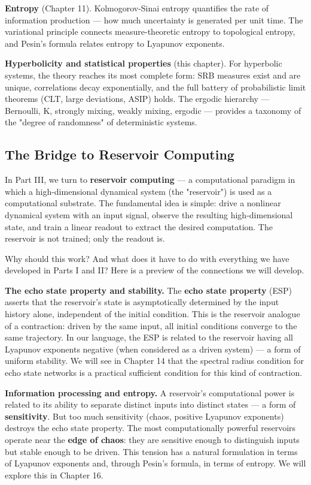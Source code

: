 \textbf{Entropy} (Chapter 11). Kolmogorov-Sinai entropy quantifies the rate of information production --- how much uncertainty is generated per unit time. The variational principle connects measure-theoretic entropy to topological entropy, and Pesin's formula relates entropy to Lyapunov exponents.

\textbf{Hyperbolicity and statistical properties} (this chapter). For hyperbolic systems, the theory reaches its most complete form: SRB measures exist and are unique, correlations decay exponentially, and the full battery of probabilistic limit theorems (CLT, large deviations, ASIP) holds. The ergodic hierarchy --- Bernoulli, K, strongly mixing, weakly mixing, ergodic --- provides a taxonomy of the "degree of randomness" of deterministic systems.


\subsection{The Bridge to Reservoir Computing}\label{sec:12.6.2}

In Part III, we turn to \textbf{reservoir computing} --- a computational paradigm in which a high-dimensional dynamical system (the "reservoir") is used as a computational substrate. The fundamental idea is simple: drive a nonlinear dynamical system with an input signal, observe the resulting high-dimensional state, and train a linear readout to extract the desired computation. The reservoir is not trained; only the readout is.

Why should this work? And what does it have to do with everything we have developed in Parts I and II? Here is a preview of the connections we will develop.

\textbf{The echo state property and stability.} The \textbf{echo state property} (ESP) asserts that the reservoir's state is asymptotically determined by the input history alone, independent of the initial condition. This is the reservoir analogue of a contraction: driven by the same input, all initial conditions converge to the same trajectory. In our language, the ESP is related to the reservoir having all Lyapunov exponents negative (when considered as a driven system) --- a form of uniform stability. We will see in Chapter 14 that the spectral radius condition for echo state networks is a practical sufficient condition for this kind of contraction.

\textbf{Information processing and entropy.} A reservoir's computational power is related to its ability to separate distinct inputs into distinct states --- a form of \textbf{sensitivity}. But too much sensitivity (chaos, positive Lyapunov exponents) destroys the echo state property. The most computationally powerful reservoirs operate near the \textbf{edge of chaos}: they are sensitive enough to distinguish inputs but stable enough to be driven. This tension has a natural formulation in terms of Lyapunov exponents and, through Pesin's formula, in terms of entropy. We will explore this in Chapter 16.

